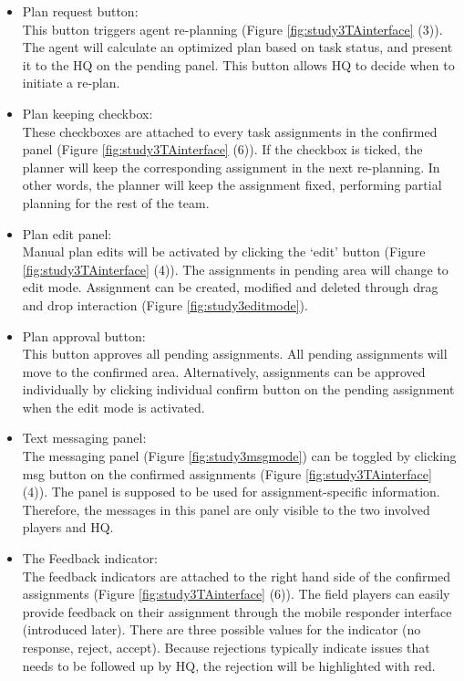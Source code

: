 \begin{itemize}
\item Plan request button: \\
This button triggers agent re-planning (Figure \ref{fig:study3TAinterface} (3)). The agent will calculate an optimized plan based on task status, and present it to the HQ on the pending panel. This button allows HQ to decide when to initiate a re-plan. \\

\item Plan keeping checkbox:\\
These checkboxes are attached to every task assignments in the confirmed panel (Figure \ref{fig:study3TAinterface} (6)). If the checkbox is ticked, the planner will keep the corresponding assignment in the next re-planning. In other words, the planner will keep the assignment fixed, performing partial planning for the rest of the team. 

\item Plan edit panel: \\
Manual plan edits will be activated by clicking the `edit' button (Figure \ref{fig:study3TAinterface} (4)). The assignments in pending area will change to edit mode. Assignment can be created, modified and deleted through drag and drop interaction (Figure \ref{fig:study3editmode}). \\

\item Plan approval button: \\
This button approves all pending assignments. All pending assignments will move to the confirmed area. Alternatively, assignments can be approved individually by clicking individual confirm button on the pending assignment when the edit mode is activated. \\

\item Text messaging panel:\\
The messaging panel (Figure \ref{fig:study3msgmode}) can be toggled by clicking msg button on the confirmed assignments (Figure \ref{fig:study3TAinterface} (4)). The panel is supposed to be used for assignment-specific information. Therefore, the messages in this panel are only visible to the two involved players and HQ.\\

\item The Feedback indicator:\\
The feedback indicators are attached to the right hand side of the confirmed assignments (Figure  \ref{fig:study3TAinterface} (6)). The field players can easily provide feedback on their assignment through the mobile responder interface (introduced later). There are three possible values for the indicator (no response, reject, accept). Because rejections typically indicate issues that needs to be followed up by HQ, the rejection will be highlighted with red. \\


\end{itemize}

